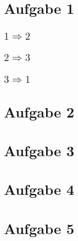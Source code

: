 \documentclass[10pt,a4paper]{article}
\begin{document}
\section{Aufgabe 1}

\subsection{$1 \Rightarrow 2$}

\subsection{$2 \Rightarrow 3$}

\subsection{$3 \Rightarrow 1$}

\section{Aufgabe 2}

\section{Aufgabe 3}

\section{Aufgabe 4}

\section{Aufgabe 5}
\end{document}
